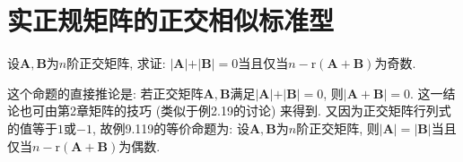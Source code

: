 \documentclass[../../main.tex]{subfiles}
\begin{document}
\section{实正规矩阵的正交相似标准型}









\begin{proposition}\label{proposition:两正交矩阵的和的秩与n的差为奇数则行列式和为0}
设\(\boldsymbol{A},\boldsymbol{B}\)为\(n\)阶正交矩阵, 求证: \(\vert\boldsymbol{A}\vert+\vert\boldsymbol{B}\vert = 0\)当且仅当\(n-\mathrm{r}(\boldsymbol{A}+\boldsymbol{B})\)为奇数.
\end{proposition}
\begin{remark}
这个命题的直接推论是: 若正交矩阵\(\boldsymbol{A},\boldsymbol{B}\)满足\(\vert\boldsymbol{A}\vert+\vert\boldsymbol{B}\vert = 0\), 则\(\vert\boldsymbol{A}+\boldsymbol{B}\vert = 0\). 这一结论也可由第2章矩阵的技巧 (类似于例2.19的讨论) 来得到. 又因为正交矩阵行列式的值等于\(1\)或\(-1\), 故例9.119的等价命题为: 设\(\boldsymbol{A},\boldsymbol{B}\)为\(n\)阶正交矩阵, 则\(\vert\boldsymbol{A}\vert = \vert\boldsymbol{B}\vert\)当且仅当\(n-\mathrm{r}(\boldsymbol{A}+\boldsymbol{B})\)为偶数.
\end{remark}
\end{document}
